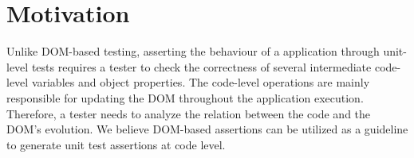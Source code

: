 \section{Motivation} \label{Sec:motivation}
Unlike DOM-based testing, asserting the behaviour of a \javascript application through unit-level tests requires a tester to check the correctness of several intermediate code-level variables and object properties. The code-level operations are mainly responsible for updating the DOM throughout the application execution. Therefore, a tester needs to analyze the relation between the \javascript code and the DOM's evolution. 
We believe DOM-based assertions can be utilized as a guideline to generate unit test assertions at \javascript code level. 

